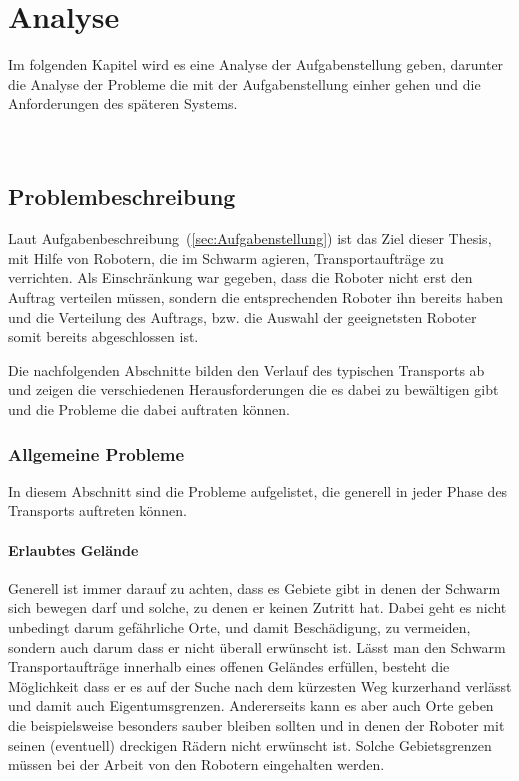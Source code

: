 \chapter{Analyse}\label{ch:Analyse}
Im folgenden Kapitel wird es eine Analyse der Aufgabenstellung geben, darunter die Analyse der Probleme die mit der Aufgabenstellung einher gehen und die Anforderungen des späteren Systems.\\

\\

\\
\section{Problembeschreibung}\label{sec:Problembeschreibung}
Laut Aufgabenbeschreibung~(\autoref{sec:Aufgabenstellung}) ist das Ziel dieser Thesis, mit Hilfe von Robotern, die im Schwarm agieren, Transportaufträge zu verrichten.
Als Einschränkung war gegeben, dass die Roboter nicht erst den Auftrag verteilen müssen, sondern die entsprechenden Roboter ihn bereits haben und die Verteilung des Auftrags, bzw. die Auswahl der geeignetsten Roboter somit bereits abgeschlossen ist.

Die nachfolgenden Abschnitte bilden den Verlauf des typischen Transports ab und zeigen die verschiedenen Herausforderungen die es dabei zu bewältigen gibt und die Probleme die dabei auftraten können.

\subsection*{Allgemeine Probleme}\label{subsec:AllgemeineProbleme}
In diesem Abschnitt sind die Probleme aufgelistet, die generell in jeder Phase des Transports auftreten können.

\subsubsection*{Erlaubtes Gelände}\label{subsubsec:ErlaubtesGelände}
Generell ist immer darauf zu achten, dass es Gebiete gibt in denen der Schwarm sich bewegen darf und solche, zu denen er keinen Zutritt hat.
Dabei geht es nicht unbedingt darum gefährliche Orte, und damit Beschädigung, zu vermeiden, sondern auch darum dass er nicht überall erwünscht ist.
Lässt man den Schwarm Transportaufträge innerhalb eines offenen Geländes erfüllen, besteht die Möglichkeit dass er es auf der Suche nach dem kürzesten Weg kurzerhand verlässt und damit auch Eigentumsgrenzen.
Andererseits kann es aber auch Orte geben die beispielsweise besonders sauber bleiben sollten und in denen der Roboter mit seinen (eventuell) dreckigen Rädern nicht erwünscht ist.
Solche Gebietsgrenzen müssen bei der Arbeit von den Robotern eingehalten werden.

